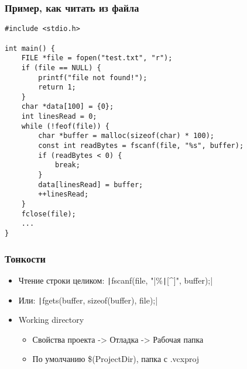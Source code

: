 \documentclass[xetex,mathserif,serif]{beamer}
\begin{document}
    \begin{frame}[fragile]
        \frametitle{Пример, как читать из файла}
        \begin{scriptsize}
            \begin{verbatim}
#include <stdio.h>

int main() {
    FILE *file = fopen("test.txt", "r");
    if (file == NULL) {
        printf("file not found!");
        return 1;
    }
    char *data[100] = {0};
    int linesRead = 0;
    while (!feof(file)) {
        char *buffer = malloc(sizeof(char) * 100);
        const int readBytes = fscanf(file, "%s", buffer);
        if (readBytes < 0) {
            break;
        }
        data[linesRead] = buffer;
        ++linesRead;
    }
    fclose(file);
    ...
}

            \end{verbatim}
        \end{scriptsize}
    \end{frame}

    \begin{frame}
        \frametitle{Тонкости}
        \begin{itemize}
            \item Чтение строки целиком: \texttt|fscanf(file, "|\%\texttt|[^\n]", buffer);|
            \item Или: \texttt|fgets(buffer, sizeof(buffer), file);|
            \item Working directory
            \begin{itemize}
                \item Свойства проекта -> Отладка -> Рабочая папка
                \item По умолчанию \$(ProjectDir), папка с .vcxproj
            \end{itemize}
        \end{itemize}
    \end{frame}
\end{document}
